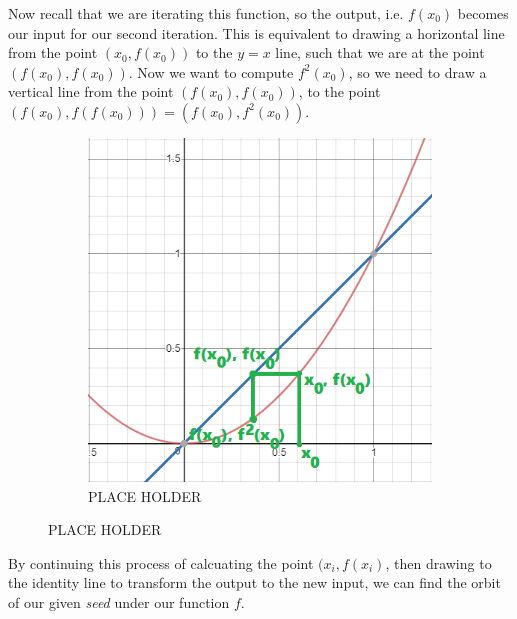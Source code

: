 \documentclass[20pt]{article} %
\begin{document}
Now recall that we are iterating this function, so the output, i.e. $f(x_0)$ becomes our input for our second iteration.  This is equivalent to drawing a horizontal line from the point $(x_0, f(x_0))$ to the $y=x$ line, such that we are at the point $(f(x_0), f(x_0))$.  Now we want to compute $f^{2}(x_0)$, so we need to draw a vertical line from the point $(f(x_0), f(x_0))$, to the point $(f(x_0), f(f(x_0))) = (f(x_0), f^{2}(x_0))$.

\begin{figure}[!htbp]
  	\centering
   	\begin{subfigure}[p]{0.5\linewidth}
    	\includegraphics[width=\linewidth]{./figures/fp-3.png}
	\caption{PLACE HOLDER}
   	\end{subfigure}
\end{figure} 

By continuing this process of calcuating the point $(x_i, f(x_i)$, then drawing to the identity line to transform the output to the new input, we can find the orbit of our given \textit{seed} under our function $f$.
\end{document}
